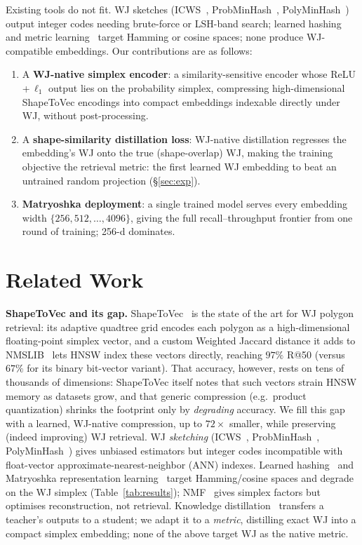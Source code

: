 \documentclass[sigconf]{acmart}
\begin{document}
Existing tools do not fit. WJ sketches (ICWS~\cite{ioffe10},
ProbMinHash~\cite{probminhash20}, PolyMinHash~\cite{polyminhash25}) output integer
codes needing brute-force or LSH-band search; learned hashing and metric
learning~\cite{hashsurvey14,deephashsurvey22} target Hamming or cosine spaces;
none produce WJ-compatible embeddings. Our contributions are as follows:
\begin{enumerate}[leftmargin=1.2em,itemsep=1pt,topsep=1pt]
  \item A \textbf{WJ-native simplex encoder}: a similarity-sensitive encoder whose
    ReLU\,+\,$\ell_1$ output lies on the probability simplex, compressing
    high-dimensional ShapeToVec encodings into compact embeddings indexable directly
    under WJ, without post-processing.
  \item A \textbf{shape-similarity distillation loss}: WJ-native distillation
    regresses the embedding's WJ onto the true (shape-overlap) WJ, making the training
    objective the retrieval metric: the first learned WJ embedding to beat an
    untrained random projection (\S\ref{sec:exp}).
  \item \textbf{Matryoshka deployment}: a single trained model serves every
    embedding width $\{256, 512, \dots,4096\}$, giving the full recall--throughput frontier from one round of training; 256-d dominates.
\end{enumerate}

\section{Related Work}
\label{sec:related}
\textbf{ShapeToVec and its gap.} ShapeToVec~\cite{shape2vec} is the state of the art
for WJ polygon retrieval: its adaptive quadtree grid encodes each polygon as a
high-dimensional floating-point simplex vector, and a custom Weighted Jaccard
distance it adds to NMSLIB~\cite{boytsov13} lets HNSW index these vectors directly,
reaching $97\%$ R@50 (versus $67\%$ for its binary bit-vector variant). That accuracy,
however, rests on tens of thousands of dimensions: ShapeToVec itself notes that such
vectors strain HNSW memory as datasets grow, and that generic compression
(e.g.\ product quantization) shrinks the footprint only by \emph{degrading} accuracy.
We fill this gap with a learned, WJ-native compression, up to $72\times$ smaller,
while preserving (indeed improving) WJ retrieval.
WJ \emph{sketching} (ICWS~\cite{ioffe10}, ProbMinHash~\cite{probminhash20},
PolyMinHash~\cite{polyminhash25}) gives unbiased estimators but integer codes
incompatible with float-vector approximate-nearest-neighbor (ANN) indexes. Learned
hashing~\cite{hashsurvey14,deephashsurvey22} and Matryoshka representation
learning~\cite{matryoshka22} target Hamming/cosine spaces and degrade on the WJ
simplex (Table~\ref{tab:results}); NMF~\cite{nmf99} gives simplex factors but
optimises reconstruction, not retrieval. Knowledge distillation~\cite{hinton15}
transfers a teacher's outputs to a student; we adapt it to a \emph{metric},
distilling exact WJ into a compact simplex embedding; none of the above target
WJ as the native metric.
\end{document}
